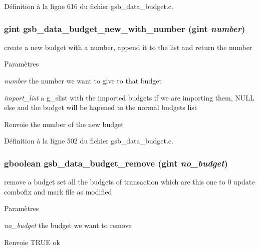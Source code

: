 Définition à la ligne 616 du fichier gsb\_\-data\_\-budget.c.

\subsubsection[{gsb\_\-data\_\-budget\_\-new\_\-with\_\-number}]{\setlength{\rightskip}{0pt plus 5cm}gint gsb\_\-data\_\-budget\_\-new\_\-with\_\-number (gint {\em number})}\label{gsb__data__budget_8c_ade0c10f8901b57f44570fc060329c7b6}
create a new budget with a number, append it to the list and return the number


\begin{DoxyParams}{Paramètres}
\item[{\em number}]the number we want to give to that budget \item[{\em import\_\-list}]a g\_\-slist with the imported budgets if we are importing them, NULL else and the budget will be hapened to the normal budgets list\end{DoxyParams}
\begin{DoxyReturn}{Renvoie}
the number of the new budget 
\end{DoxyReturn}


Définition à la ligne 502 du fichier gsb\_\-data\_\-budget.c.

\subsubsection[{gsb\_\-data\_\-budget\_\-remove}]{\setlength{\rightskip}{0pt plus 5cm}gboolean gsb\_\-data\_\-budget\_\-remove (gint {\em no\_\-budget})}\label{gsb__data__budget_8c_a895e0a12bb94ecd94095e5aab8aa05d7}
remove a budget set all the budgets of transaction which are this one to 0 update combofix and mark file as modified


\begin{DoxyParams}{Paramètres}
\item[{\em no\_\-budget}]the budget we want to remove\end{DoxyParams}
\begin{DoxyReturn}{Renvoie}
TRUE ok 
\end{DoxyReturn}


